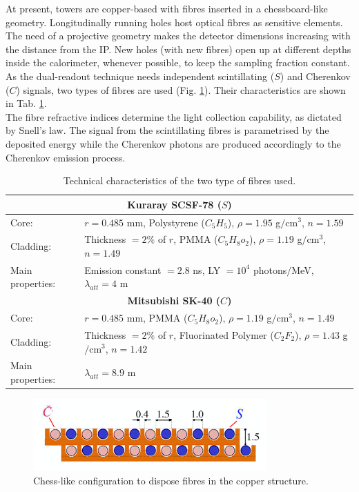 At present, towers are copper-based with fibres inserted in a chessboard-like geometry. Longitudinally running holes host optical fibres as sensitive elements. The need of a projective geometry makes the detector dimensions increasing with the distance from the IP. New holes (with new fibres) open up at different depths inside the calorimeter, whenever possible, to keep the sampling fraction constant.\\
As the dual-readout technique needs independent scintillating ($S$) and Cherenkov ($C$) signals, two types of fibres are used (Fig. \ref{fig:CS_fibres}). Their characteristics are shown in Tab. \ref{tab:fibres}.\\
The fibre refractive indices determine the light collection capability, as dictated by Snell's law. The signal from the scintillating fibres is parametrised by the deposited energy while the Cherenkov photons are produced accordingly to the Cherenkov emission process.\\

\begin{table}
	\centering
	\setlength{\tabcolsep}{12pt}
	\begin{tabular}{lp{}}
		\toprule
		\multicolumn{2}{c}{\textbf{Kuraray SCSF-78 ($S$)}}	\\
		\midrule
		Core:				& $r = 0.485$ mm, Polystyrene ($C_5H_5$), $\rho=1.95$ g$/$cm$^3$, $n = 1.59$	\\
		Cladding: 			& Thickness $=2\%$ of $r$, PMMA ($C_5H_8o_2$), $\rho=1.19$ g$/$cm$^3$, $n=1.49$	\\
		Main properties:	& Emission constant $= 2.8$ ns, LY $= 10^4$ photons$/$MeV, $\lambda_{att} = 4$ m	\\
		\midrule
		\multicolumn{2}{c}{\textbf{Mitsubishi SK-40 ($C$)}}	\\
		\midrule
		Core:				& $r = 0.485$ mm, PMMA ($C_5H_8o_2$), $\rho=1.19$ g$/$cm$^3$, $n = 1.49$	\\
		Cladding: 			& Thickness $=2\%$ of $r$, Fluorinated Polymer ($C_2F_2$), $\rho=1.43$ g$/$cm$^3$, $n=1.42$	\\
		Main properties:	& $\lambda_{att} = 8.9$	m\\
		\bottomrule
	\end{tabular}
	\caption{Technical characteristics of the two type of fibres used.}
	\label{tab:fibres}
\end{table}

\begin{figure}
	\centering
	\includegraphics[width=0.8\textwidth]{IMG/DRCGeometry2}
	\caption{Chess-like configuration to dispose fibres in the copper structure.}
	\label{fig:CS_fibres}
\end{figure}

